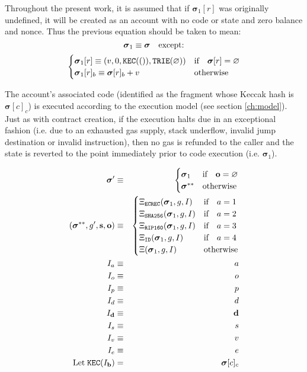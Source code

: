 \documentclass[9pt,oneside]{amsart}
\begin{document}
\begin{multicols}{2}
Throughout the present work, it is assumed that if $\boldsymbol{\sigma}_1[r]$ was originally undefined, it will be created as an account with no code or state and zero balance and nonce. Thus the previous equation should be taken to mean:
\begin{equation}
\boldsymbol{\sigma}_1 \equiv \boldsymbol{\sigma} \quad \text{except:} \\
\end{equation}
\begin{equation}
\begin{cases}
\boldsymbol{\sigma}_1[r] \equiv (v, 0, \mathtt{\tiny KEC}(()), \mathtt{\tiny TRIE}(\varnothing)) & \text{if} \quad \boldsymbol{\sigma}[r] = \varnothing \\
\boldsymbol{\sigma}_1[r]_b \equiv \boldsymbol{\sigma}[r]_b + v & \text{otherwise}
\end{cases}
\end{equation}

The account's associated code (identified as the fragment whose Keccak hash is $\boldsymbol{\sigma}[c]_c$) is executed according to the execution model (see section \ref{ch:model}). Just as with contract creation, if the execution halts due in an exceptional fashion (i.e. due to an exhausted gas supply, stack underflow, invalid jump destination or invalid instruction), then no gas is refunded to the caller and the state is reverted to the point immediately prior to code execution (i.e. $\boldsymbol{\sigma}_1$).

\begin{eqnarray}
\boldsymbol{\sigma}' & \equiv & \begin{cases}
\boldsymbol{\sigma}_1 & \text{if} \quad \mathbf{o} = \varnothing \\
\boldsymbol{\sigma}^{**} & \text{otherwise}
\end{cases} \\
(\boldsymbol{\sigma}^{**}, g', \mathbf{s}, \mathbf{o}) & \equiv & \begin{cases}
\Xi_{\mathtt{ECREC}}(\boldsymbol{\sigma}_1, g, I) & \text{if} \quad a = 1 \\
\Xi_{\mathtt{SHA256}}(\boldsymbol{\sigma}_1, g, I) & \text{if} \quad a = 2 \\
\Xi_{\mathtt{RIP160}}(\boldsymbol{\sigma}_1, g, I) & \text{if} \quad a = 3 \\
\Xi_{\mathtt{ID}}(\boldsymbol{\sigma}_1, g, I) & \text{if} \quad a = 4 \\
\Xi(\boldsymbol{\sigma}_1, g, I) & \text{otherwise} \end{cases} \\
I_a & \equiv & a \\
I_o & \equiv & o \\
I_p & \equiv & p \\
I_d & \equiv & d \\
I_\mathbf{d} & \equiv & \mathbf{d} \\
I_s & \equiv & s \\
I_v & \equiv & v \\
I_e & \equiv & e \\
\text{Let} \; \mathtt{\tiny KEC}(I_\mathbf{b}) & = & \boldsymbol{\sigma}[c]_c
\end{eqnarray}


\end{multicols}
\end{document}
